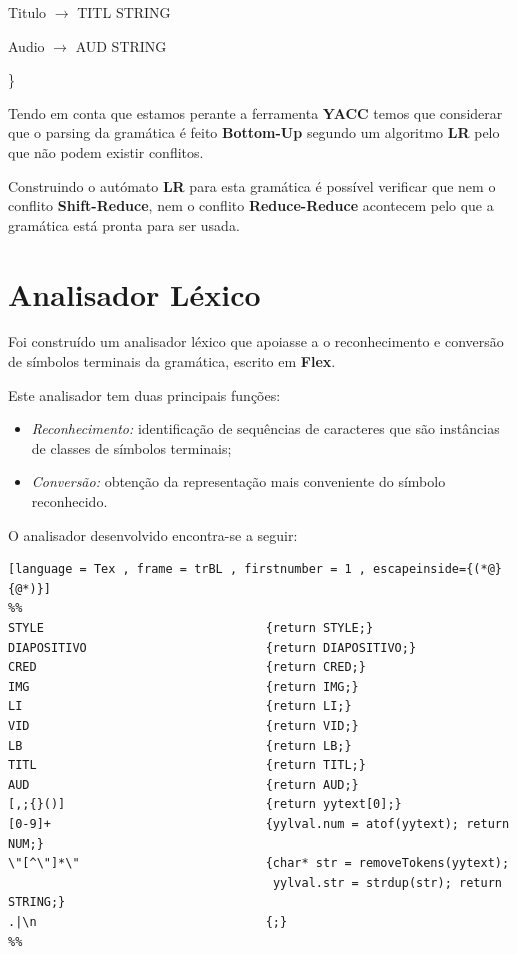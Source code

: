 \documentclass[11pt,a4paper]{report}
\begin{document}
\vspace{0.2cm}
\hspace{1.0cm} Titulo $\rightarrow$ TITL STRING

\vspace{0.2cm}
\hspace{1.0cm} Audio $\rightarrow$ AUD STRING


\hspace{0.7cm} \}

\vspace{0.5cm}

Tendo em conta que estamos perante a ferramenta \textbf{YACC} temos que considerar que o parsing da gramática é feito \textbf{Bottom-Up} segundo um algoritmo \textbf{LR} pelo que não podem existir conflitos.

Construindo o autómato \textbf{LR} para esta gramática é possível verificar que nem o conflito \textbf{Shift-Reduce}, nem o conflito \textbf{Reduce-Reduce} acontecem pelo que a gramática está pronta para ser usada.


\section{Analisador Léxico}

Foi construído um analisador léxico que apoiasse a o reconhecimento e conversão de símbolos terminais da gramática, escrito em \textbf{Flex}.

Este analisador tem duas principais funções:

\begin{itemize}
	\item \textit{Reconhecimento:} identificação de sequências de caracteres que são instâncias de classes de símbolos terminais;
	\item \textit{Conversão:} obtenção da representação mais conveniente do símbolo reconhecido.
\end{itemize}

O analisador desenvolvido encontra-se a seguir:

\vspace{0.5cm}

\begin{lstlisting}[language = Tex , frame = trBL , firstnumber = 1 , escapeinside={(*@}{@*)}]
%%
STYLE                               {return STYLE;}
DIAPOSITIVO                         {return DIAPOSITIVO;}
CRED                                {return CRED;}
IMG                                 {return IMG;}
LI                                  {return LI;}
VID                                 {return VID;}
LB                                  {return LB;}
TITL                                {return TITL;}
AUD                                 {return AUD;}
[,;{}()]                            {return yytext[0];}
[0-9]+                              {yylval.num = atof(yytext); return NUM;}
\"[^\"]*\"                          {char* str = removeTokens(yytext);
				      				 yylval.str = strdup(str); return STRING;}
.|\n                                {;}
%%
\end{lstlisting}
\end{document}
